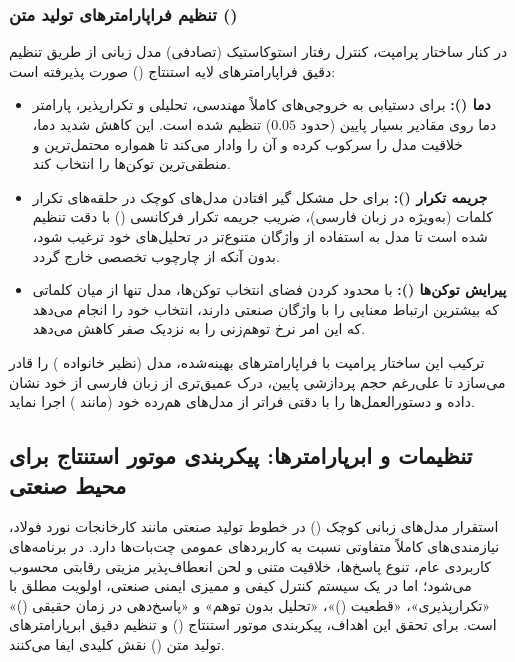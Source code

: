 \documentclass[a4paper, 10pt, twocolumn]{article}
\begin{document}
	\subsubsection{تنظیم فراپارامترهای تولید متن ()}
	در کنار ساختار پرامپت، کنترل رفتار استوکاستیک (تصادفی) مدل زبانی از طریق تنظیم دقیق فراپارامترهای لایه استنتاج () صورت پذیرفته است:
	\begin{itemize}
		\item \textbf{دما ():} برای دستیابی به خروجی‌های کاملاً مهندسی، تحلیلی و تکرارپذیر، پارامتر دما روی مقادیر بسیار پایین (حدود $0.05$) تنظیم شده است. این کاهش شدید دما، خلاقیت مدل را سرکوب کرده و آن را وادار می‌کند تا همواره محتمل‌ترین و منطقی‌ترین توکن‌ها را انتخاب کند.
		\item \textbf{جریمه تکرار ():} برای حل مشکل گیر افتادن مدل‌های کوچک در حلقه‌های تکرار کلمات (به‌ویژه در زبان فارسی)، ضریب جریمه تکرار فرکانسی () با دقت تنظیم شده است تا مدل به استفاده از واژگان متنوع‌تر در تحلیل‌های خود ترغیب شود، بدون آنکه از چارچوب تخصصی خارج گردد.
		\item \textbf{پیرایش توکن‌ها ():} با محدود کردن فضای انتخاب توکن‌ها، مدل تنها از میان کلماتی که بیشترین ارتباط معنایی را با واژگان صنعتی دارند، انتخاب خود را انجام می‌دهد که این امر نرخ توهم‌زنی را به نزدیک صفر کاهش می‌دهد.
	\end{itemize}
	
	ترکیب این ساختار پرامپت با فراپارامترهای بهینه‌شده، مدل  (نظیر خانواده ) را قادر می‌سازد تا علی‌رغم حجم پردازشی پایین، درک عمیق‌تری از زبان فارسی از خود نشان داده و دستورالعمل‌ها را با دقتی فراتر از مدل‌های هم‌رده خود (مانند ) اجرا نماید.
	
	\subsection{تنظیمات و ابرپارامترها: پیکربندی موتور استنتاج برای محیط صنعتی}
	
	استقرار مدل‌های زبانی کوچک () در خطوط تولید صنعتی مانند کارخانجات نورد فولاد، نیازمندی‌های کاملاً متفاوتی نسبت به کاربردهای عمومی چت‌بات‌ها دارد. در برنامه‌های کاربردی عام، تنوع پاسخ‌ها، خلاقیت متنی و لحن انعطاف‌پذیر مزیتی رقابتی محسوب می‌شود؛ اما در یک سیستم کنترل کیفی و ممیزی ایمنی صنعتی، اولویت مطلق با «تکرارپذیری»، «قطعیت ()»، «تحلیل بدون توهم» و «پاسخ‌دهی در زمان حقیقی ()» است. برای تحقق این اهداف، پیکربندی موتور استنتاج () و تنظیم دقیق ابرپارامترهای تولید متن () نقش کلیدی ایفا می‌کنند.
	
\end{document}
